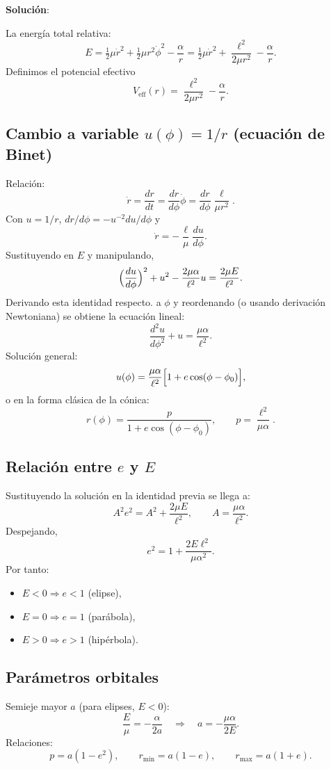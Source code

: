 \documentclass{article}
\begin{document}
\textcolor{Cinnabar}{\textbf{Solución}}:

La energía total relativa:
\[
E = \tfrac12\mu\dot r^2 + \tfrac12\mu r^2\dot\phi^2 - \frac{\alpha}{r}
= \tfrac12\mu\dot r^2 + \frac{\ell^2}{2\mu r^2} - \frac{\alpha}{r}.
\]
Definimos el potencial efectivo
\[
V_{\mathrm{eff}}(r) = \frac{\ell^2}{2\mu r^2} - \frac{\alpha}{r}.
\]

\subsection*{Cambio a variable \(u(\phi)=1/r\) (ecuación de Binet)}
Relación:
\[
\dot r = \frac{dr}{dt} = \frac{dr}{d\phi}\dot\phi = \frac{dr}{d\phi}\frac{\ell}{\mu r^2}.
\]
Con \(u=1/r\), \(dr/d\phi = -u^{-2} du/d\phi\) y
\[
\dot r = -\frac{\ell}{\mu}\frac{du}{d\phi}.
\]
Sustituyendo en \(E\) y manipulando,
\[
\Bigl(\frac{du}{d\phi}\Bigr)^2 + u^2 - \frac{2\mu\alpha}{\ell^2}u = \frac{2\mu E}{\ell^2}.
\]
Derivando esta identidad respecto. a \(\phi\) y reordenando (o usando derivación Newtoniana) se obtiene la ecuación lineal:
\[
\frac{d^2 u}{d\phi^2} + u = \frac{\mu\alpha}{\ell^2}.
\]
Solución general:
\[
u(\phi) = \frac{\mu\alpha}{\ell^2}\Bigl[1 + e\cos(\phi-\phi_0)\Bigr],
\]
o en la forma clásica de la cónica:
\[
\boxed{\displaystyle r(\phi) = \frac{p}{1+e\cos(\phi-\phi_0)},\qquad p=\frac{\ell^2}{\mu\alpha}.}
\]

\subsection*{Relación entre \(e\) y \(E\)}
Sustituyendo la solución en la identidad previa se llega a:
\[
A^2 e^2 = A^2 + \frac{2\mu E}{\ell^2},
\qquad A=\frac{\mu\alpha}{\ell^2}.
\]
Despejando,
\[
\boxed{e^2 = 1 + \frac{2E\ell^2}{\mu\alpha^2}.}
\]
Por tanto:
\begin{itemize}
    \item \(E<0 \Rightarrow e<1\) (elipse),
    \item \(E=0 \Rightarrow e=1\) (parábola),
    \item \(E>0 \Rightarrow e>1\) (hipérbola).
\end{itemize}

\subsection*{Parámetros orbitales}
Semieje mayor \(a\) (para elipses, \(E<0\)):
\[
\frac{E}{\mu} = -\frac{\alpha}{2a} \quad\Rightarrow\quad a = -\frac{\mu\alpha}{2E}.
\]
Relaciones:
\[
p = a(1-e^2),\qquad r_{\min} = a(1-e),\qquad r_{\max}=a(1+e).
\]
\end{document}
